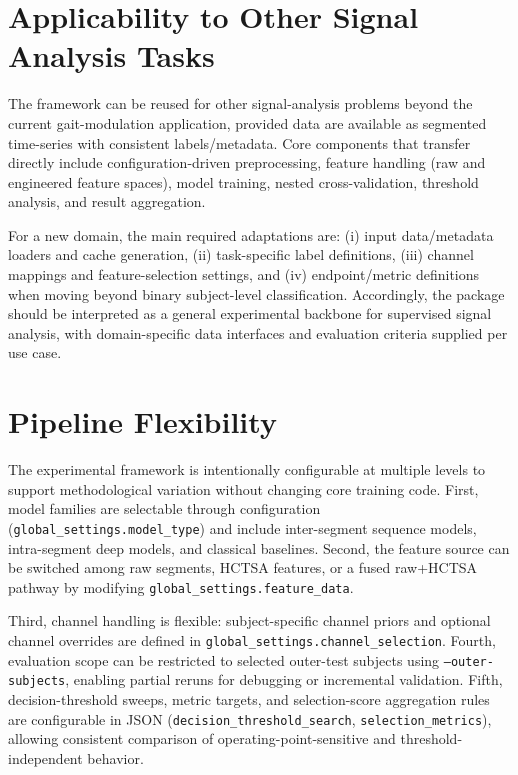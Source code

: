 \section{Applicability to Other Signal Analysis Tasks}
\label{sec:reproducibility_applicability_other_signals}
The framework can be reused for other signal-analysis problems beyond the current gait-modulation application, provided data are available as segmented time-series with consistent labels/metadata. Core components that transfer directly include configuration-driven preprocessing, feature handling (raw and engineered feature spaces), model training, nested cross-validation, threshold analysis, and result aggregation.

For a new domain, the main required adaptations are: (i) input data/metadata loaders and cache generation, (ii) task-specific label definitions, (iii) channel mappings and feature-selection settings, and (iv) endpoint/metric definitions when moving beyond binary subject-level classification. Accordingly, the package should be interpreted as a general experimental backbone for supervised signal analysis, with domain-specific data interfaces and evaluation criteria supplied per use case.

\section{Pipeline Flexibility}
\label{sec:reproducibility_flexibility}
The experimental framework is intentionally configurable at multiple levels to support methodological variation without changing core training code. First, model families are selectable through configuration (\texttt{global\_settings.model\_type}) and include inter-segment sequence models, intra-segment deep models, and classical baselines. Second, the feature source can be switched among raw segments, HCTSA features, or a fused raw+HCTSA pathway by modifying \texttt{global\_settings.feature\_data}.

Third, channel handling is flexible: subject-specific channel priors and optional channel overrides are defined in \texttt{global\_settings.channel\_selection}. Fourth, evaluation scope can be restricted to selected outer-test subjects using \texttt{--outer-subjects}, enabling partial reruns for debugging or incremental validation. Fifth, decision-threshold sweeps, metric targets, and selection-score aggregation rules are configurable in JSON (\texttt{decision\_threshold\_search}, \texttt{selection\_metrics}), allowing consistent comparison of operating-point-sensitive and threshold-independent behavior.

